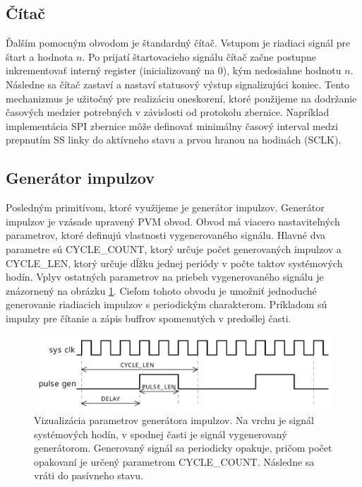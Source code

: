 \subsection{Čítač}
Ďalším pomocným obvodom je štandardný čítač. Vstupom je riadiaci signál pre štart a hodnota $n$. Po prijatí štartovacieho signálu čítač začne postupne inkrementovať interný register (inicializovaný na 0), kým nedosiahne hodnotu $n$. Následne sa čítač zastaví a nastaví statusový výstup signalizujúci koniec. Tento mechanizmus je užitočný pre realizáciu oneskorení, ktoré použijeme na dodržanie časových medzier potrebných v závislosti od protokolu zbernice. Napríklad implementácia SPI zbernice môže definovať minimálny časový interval medzi prepnutím SS linky do aktívneho stavu a prvou hranou na hodinách (SCLK).

\subsection{Generátor impulzov}
Posledným primitívom, ktoré využijeme je generátor impulzov. Generátor impulzov je vzásade upravený PVM obvod. Obvod má viacero nastaviteľných parametrov, ktoré definujú vlastnosti vygenerovaného signálu. Hlavné dva parametre sú CYCLE\_COUNT, ktorý určuje počet generovaných impulzov a CYCLE\_LEN, ktorý určuje dĺžku jednej periódy v počte taktov systémových hodín. Vplyv ostatných parametrov na priebeh vygenerovaného signálu je znázornený na obrázku \ref{obr:pulseGen}. Cieľom tohoto obvodu je umožniť jednoduché generovanie riadiacich impulzov s periodickým charakterom. Príkladom sú impulzy pre čítanie a zápis buffrov spomenutých v predošlej časti.

\begin{figure}
    \centerline{\includegraphics[width=1\textwidth]{images/signals/pulseGen.pdf}}
    \caption[Vizualizácia parametrov generátora impulzov]{Vizualizácia parametrov generátora impulzov. Na vrchu je signál systémových hodín, v spodnej časti je signál vygenerovaný generátorom. Generovaný signál sa periodicky opakuje, pričom počet opakovaní je určený parametrom CYCLE\_COUNT. Následne sa vráti do pasívneho stavu.}
    \label{obr:pulseGen}
\end{figure}

